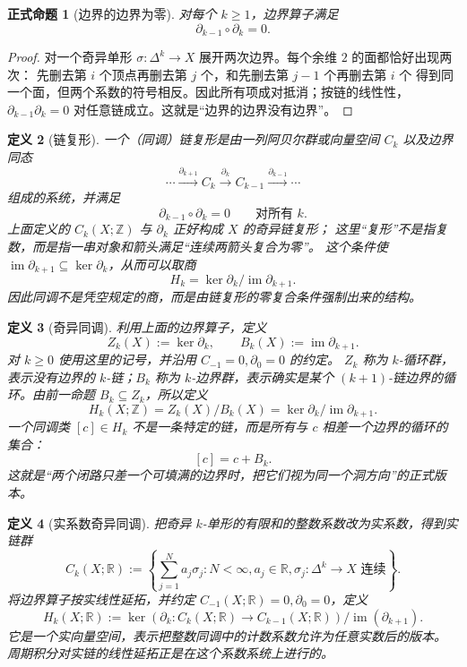 \documentclass[UTF8,fontset=none,a4paper,11pt]{ctexart}
\theoremstyle{foundation-definition}
\newtheorem{definition}{定义}[section]
\theoremstyle{foundation-theorem}
\theoremstyle{foundation-proposition}
\newtheorem{proposition}[definition]{正式命题}
\theoremstyle{foundation-example}
\theoremstyle{foundation-remark}
\theoremstyle{foundation-theorem}
\begin{document}
\begin{proposition}[边界的边界为零]\label{prop:boundary-square-zero}
对每个 \(k\geq1\)，边界算子满足
\[
\partial_{k-1}\circ\partial_k=0.
\]
\end{proposition}

\begin{proof}
对一个奇异单形 \(\sigma:\Delta^k\to X\) 展开两次边界。每个余维 \(2\) 的面都恰好出现两次：
先删去第 \(i\) 个顶点再删去第 \(j\) 个，和先删去第 \(j-1\) 个再删去第 \(i\) 个
得到同一个面，但两个系数的符号相反。因此所有项成对抵消；按链的线性性，
\(\partial_{k-1}\partial_k=0\) 对任意链成立。这就是“边界的边界没有边界”。
\end{proof}

\begin{definition}[链复形]\label{def:chain-complex}
一个（同调）链复形是由一列阿贝尔群或向量空间 \(C_k\) 以及边界同态
\[
\cdots\xrightarrow{\partial_{k+1}}C_k
\xrightarrow{\partial_k}C_{k-1}
\xrightarrow{\partial_{k-1}}\cdots
\]
组成的系统，并满足
\[
\partial_{k-1}\circ\partial_k=0
\qquad\text{对所有 }k.
\]
上面定义的 \(C_k(X;\mathbb Z)\) 与 \(\partial_k\) 正好构成 \(X\) 的奇异链复形；
这里“复形”不是指复数，而是指一串对象和箭头满足“连续两箭头复合为零”。
这个条件使 \(\operatorname{im}\partial_{k+1}\subseteq\ker\partial_k\)，从而可以取商
\[
H_k=\ker\partial_k/\operatorname{im}\partial_{k+1}.
\]
因此同调不是凭空规定的商，而是由链复形的零复合条件强制出来的结构。
\end{definition}

\begin{definition}[奇异同调]\label{def:homology}
利用上面的边界算子，定义
\[
Z_k(X):=\ker\partial_k,\qquad
B_k(X):=\operatorname{im}\partial_{k+1}.
\]
对 \(k\geq0\) 使用这里的记号，并沿用 \(C_{-1}=0,\partial_0=0\) 的约定。
\(Z_k\) 称为 \(k\)-循环群，表示没有边界的 \(k\)-链；\(B_k\) 称为 \(k\)-边界群，表示确实是某个
\((k+1)\)-链边界的循环。由前一命题 \(B_k\subseteq Z_k\)，所以定义
\[
H_k(X;\mathbb Z)=Z_k(X)/B_k(X)=\ker\partial_k/\operatorname{im}\partial_{k+1}.
\]
一个同调类 \([c]\in H_k\) 不是一条特定的链，而是所有与 \(c\) 相差一个边界的循环的集合：
\[
[c]=c+B_k.
\]
这就是“两个闭路只差一个可填满的边界时，把它们视为同一个洞方向”的正式版本。
\end{definition}

\begin{definition}[实系数奇异同调]\label{def:real-homology}
把奇异 \(k\)-单形的有限和的整数系数改为实系数，得到实链群
\[
C_k(X;\mathbb R):=\left\{\sum_{j=1}^{N}a_j\sigma_j:
N<\infty, a_j\in\mathbb R, \sigma_j:\Delta^k\to X\text{ 连续}\right\}.
\]
将边界算子按实线性延拓，并约定 \(C_{-1}(X;\mathbb R)=0,\partial_0=0\)，定义
\[
H_k(X;\mathbb R):=\ker(\partial_k:C_k(X;\mathbb R)\to C_{k-1}(X;\mathbb R))
\big/\operatorname{im}(\partial_{k+1}).
\]
它是一个实向量空间，表示把整数同调中的计数系数允许为任意实数后的版本。
周期积分对实链的线性延拓正是在这个系数系统上进行的。
\end{definition}
\end{document}
